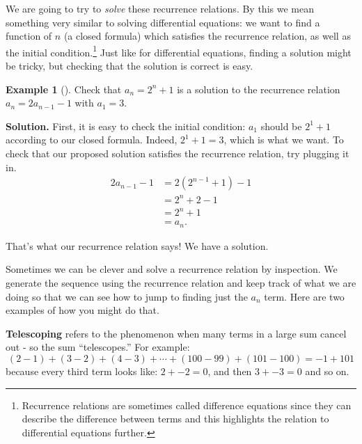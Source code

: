 \documentclass[10pt,]{book}
\newcommand{\terminology}[1]{\textbf{#1}}
\theoremstyle{plain}
\theoremstyle{definition}
\theoremstyle{definition}
\newtheorem{example}[theorem]{Example}
\theoremstyle{definition}
\theoremstyle{definition}
\numberwithin{equation}{chapter}
\newcommand{\amp}{&}
\begin{document}
\hypertarget{p-295}{}%
We are going to try to \emph{solve} these recurrence relations. By this we mean something very similar to solving differential equations: we want to find a function of \(n\) (a closed formula) which satisfies the recurrence relation, as well as the initial condition.\footnote{Recurrence relations are sometimes called difference equations since they can describe the difference between terms and this highlights the relation to differential equations further.\label{fn-2}} Just like for differential equations, finding a solution might be tricky, but checking that the solution is correct is easy.%
\begin{example}[]\label{example-19}
\hypertarget{p-296}{}%
Check that \(a_n = 2^n + 1\) is a solution to the recurrence relation \(a_n = 2a_{n-1} - 1\) with \(a_1 = 3\).%
\par\smallskip%
\noindent\textbf{Solution.}\hypertarget{solution-33}{}\quad%
\hypertarget{p-297}{}%
First, it is easy to check the initial condition: \(a_1\) should be \(2^1 + 1\) according to our closed formula. Indeed, \(2^1 + 1 = 3\), which is what we want. To check that our proposed solution satisfies the recurrence relation, try plugging it in.%
\begin{align*}
2a_{n-1} - 1 \amp = 2(2^{n-1} + 1) - 1 \\
\amp = 2^n + 2 - 1 \\
\amp = 2^n +1\\
\amp = a_n.
\end{align*}
%
\par
\hypertarget{p-298}{}%
That's what our recurrence relation says! We have a solution.%
\end{example}
\hypertarget{p-299}{}%
Sometimes we can be clever and solve a recurrence relation by inspection. We generate the sequence using the recurrence relation and keep track of what we are doing so that we can see how to jump to finding just the \(a_n\) term. Here are two examples of how you might do that.%
\par
\hypertarget{p-300}{}%
\terminology{Telescoping} refers to the phenomenon when many terms in a large sum cancel out - so the sum ``telescopes.'' For example:%
\begin{equation*}
(2 - 1) + (3 - 2) + (4 - 3) + \cdots + (100 - 99) + (101 - 100) = -1 + 101
\end{equation*}
because every third term looks like: \(2 + -2 = 0\), and then \(3 + -3 = 0\) and so on.%
\par
\hypertarget{p-301}{}%
\end{document}
